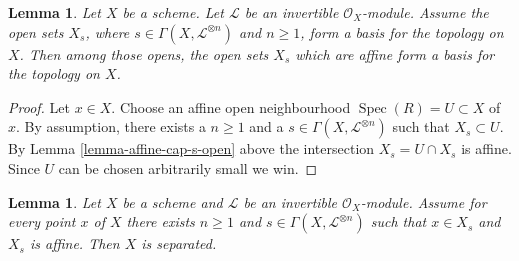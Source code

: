\documentclass{stacks-project}
\theoremstyle{plain}
\newtheorem{lemma}[subsection]{Lemma}
\theoremstyle{definition}
\theoremstyle{remark}
\numberwithin{equation}{subsection}
\def\Spec{\mathop{\mathrm{Spec}}}
\begin{document}
\begin{lemma}
\label{lemma-affine-s-opens}
Let $X$ be a scheme. Let $\mathcal{L}$ be an invertible $\mathcal{O}_X$-module.
Assume the open sets $X_s$, where $s \in \Gamma(X, \mathcal{L}^{\otimes n})$
and $n \geq 1$, form a basis for the topology on $X$.
Then among those opens, the open sets $X_s$ which are affine
form a basis for the topology on $X$.
\end{lemma}

\begin{proof}
Let $x \in X$. Choose an affine open neighbourhood
$\Spec(R) = U \subset X$ of $x$.
By assumption, there exists
a $n \geq 1$ and a $s \in \Gamma(X, \mathcal{L}^{\otimes n})$
such that $X_s \subset U$. By Lemma \ref{lemma-affine-cap-s-open} above
the intersection $X_s = U \cap X_s$ is affine.
Since $U$ can be chosen arbitrarily small we win.
\end{proof}

\begin{lemma}
\label{lemma-affine-s-opens-cover-quasi-separated}
Let $X$ be a scheme and $\mathcal{L}$ be an invertible $\mathcal{O}_X$-module.
Assume for every point $x$ of $X$ there exists $n \geq 1$ and
$s \in \Gamma(X, \mathcal{L}^{\otimes n})$ such that
$x \in X_s$ and $X_s$ is affine. Then $X$ is separated.
\end{lemma}
\end{document}
